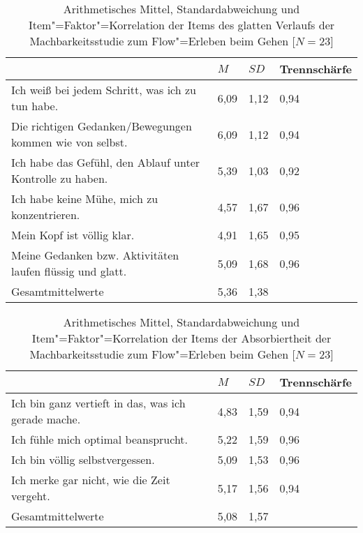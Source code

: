 \begin{table}
	[!htb] \centering \caption[Item"=Faktor"=Korrelation der Items des glatten Verlaufs (Machbarkeitsstudie: Gehen)]{Arithmetisches Mittel, Standardabweichung und Item"=Faktor"=Korrelation der Items des glatten Verlaufs der Machbarkeitsstudie zum Flow"=Erleben beim Gehen [$N = 23$]} \label{tab:glatter_verlauf_2} 
	\begin{tabularx}
		{ 
		\textwidth}{p{} p{} p{} p{}} \toprule & $M$ & $SD$ & Trennschärfe \\
		\midrule Ich weiß bei jedem Schritt, was ich zu tun habe. & 6,09 & 1,12 & 0,94 \\
		Die richtigen Gedanken/Bewegungen kommen wie von selbst. & 6,09 & 1,12 & 0,94 \\
		Ich habe das Gefühl, den Ablauf unter Kontrolle zu haben. & 5,39 & 1,03 & 0,92 \\
		Ich habe keine Mühe, mich zu konzentrieren. & 4,57 & 1,67 & 0,96 \\
		Mein Kopf ist völlig klar. & 4,91 & 1,65 & 0,95 \\
		Meine Gedanken bzw. Aktivitäten laufen flüssig und glatt. & 5,09 & 1,68 & 0,96 \\
		Gesamtmittelwerte & 5,36 & 1,38 & \\
		\bottomrule 
	\end{tabularx}
\end{table}
\begin{table}
	[!htb] \centering \caption[Item"=Faktor"=Korrelation der Items der Absorbiertheit (Machbarkeitsstudie: Gehen)]{Arithmetisches Mittel, Standardabweichung und Item"=Faktor"=Korrelation der Items der Absorbiertheit der Machbarkeitsstudie zum Flow"=Erleben beim Gehen [$N = 23$]} \label{tab:absorbiertheit_2} 
	\begin{tabularx}
		{ 
		\textwidth}{p{} p{} p{} p{}} \toprule & $M$ & $SD$ & Trennschärfe \\
		\midrule Ich bin ganz vertieft in das, was ich gerade mache. & 4,83 & 1,59 & 0,94 \\
		Ich fühle mich optimal beansprucht. & 5,22 & 1,59 & 0,96 \\
		Ich bin völlig selbstvergessen. & 5,09 & 1,53 & 0,96 \\
		Ich merke gar nicht, wie die Zeit vergeht. & 5,17 & 1,56 & 0,94 \\
		Gesamtmittelwerte & 5,08 & 1,57 & \\
		\bottomrule 
	\end{tabularx}
\end{table}

